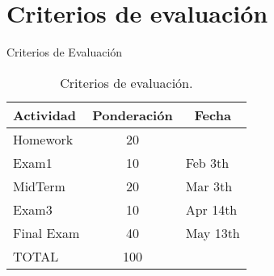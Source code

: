 \section{Criterios de evaluación}
\begin{frame}{Criterios de Evaluación}
  
  \begin{table}[h]
    \centering
    \begin{tabular}{lcl}
      \toprule[2pt]
      \textbf{Actividad} & \textbf{Ponderación} & \multicolumn{1}{c}{\textbf{Fecha}}\\ \midrule
      Homework & 20 & \\
      Exam1 & 10 & Feb 3th  \\
      MidTerm & 20 & Mar 3th   \\
      Exam3 & 10 & Apr 14th   \\
      Final Exam & 40 & May 13th   \\
      \midrule
      TOTAL & 100 \\ \bottomrule[1.5pt]
    \end{tabular}
    \caption{Criterios de evaluación.}
    \label{tab:criteriosEvaluacion}
  \end{table}
\end{frame}


\begin{comment}
  
\begin{frame}
  \frametitle{Lineamientos}
  \begin{itemize} \justifying \parskip3mm

  \item<only@1> 15 a 30 minutos retardo, después de este tiempo se considera falta.
      \item<only@1> Si llegan tarde, por favor entrar en silencio.
      \item<only@1> Retardos, se colocan al final de la clase.
      \item<only@1> Respeto, actitud, evitar groserías.
      \item<only@1> Copiar exámenes o tareas anula calificación  correspondiente.
      \item<only@2> Examenes se aplican \alert{solo en fecha y hora establecida}.
      \item<only@2>  Pueden  \alert{tomar alimentos muy ligeros y sin olores fuertes} dentro del salón de clase,
      \item<only@2> Encender equipos al llegar
  \end{itemize}
\end{frame}
\end{comment}





